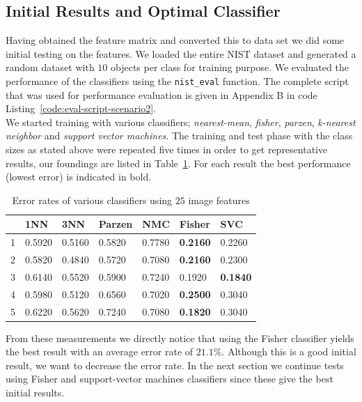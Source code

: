 \documentclass{article}
\begin{document}
\subsection{Initial Results and Optimal Classifier}

Having obtained the feature matrix and converted this to data set we did some initial testing on the features. We loaded the entire NIST dataset and generated a random dataset with $10$ objects per class for training purpose. We evaluated the performance of the classifiers using the \texttt{nist\_eval} function. The complete script that was used for performance evaluation is given in Appendix B in code Listing~\ref{code:eval-script-scenario2}. \\

We started training with various classifiers; \emph{nearest-mean}, \emph{fisher}, \emph{parzen}, \emph{k-nearest neighbor} and \emph{support vector machines}. The training and test phase with the class sizes as stated above were repeated five times in order to get representative results, our foundings are listed in Table~\ref{table:results-only-features}. For each result the best performance (lowest error) is indicated in bold. 

\begin{table}[H]
	\centering
    \begin{tabular}{|l|llllll|}
    \hline
	& \textbf{1NN} & \textbf{3NN} & \textbf{Parzen} & \textbf{NMC} & \textbf{Fisher} & \textbf{SVC} \\
	\hline
1 & 0.5920    & 0.5160    & 0.5820    & 0.7780 & \textbf{0.2160}   & 0.2260 \\
2 & 0.5820    & 0.4840    & 0.5720    & 0.7080 & \textbf{0.2160}   & 0.2300 \\
3 & 0.6140    & 0.5520    & 0.5900    & 0.7240 & 0.1920   & \textbf{0.1840} \\
4 & 0.5980    & 0.5120    & 0.6560    & 0.7020 & \textbf{0.2500}   & 0.3040 \\
5 & 0.6220    & 0.5620    & 0.7240    & 0.7080 & \textbf{0.1820}   & 0.3040 \\
	\hline
    \end{tabular}
    \caption{Error rates of various classifiers using $25$ image features \label{table:results-only-features}}
\end{table}

From these measurements we directly notice that using the Fisher classifier yields the best result with an average error rate of $21.1\%$. Although this is a good initial result, we want to decrease the error rate. In the next section we continue tests using Fisher and support-vector machines classifiers since these give the best initial results.
\end{document}
